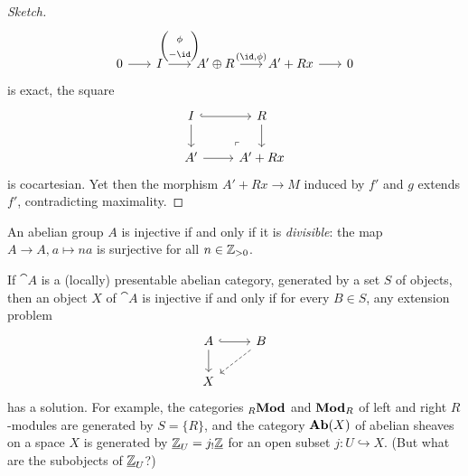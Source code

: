 \documentclass[../main.tex]{subfiles}
\begin{document}
\begin{proof}[Sketch]
\[\begin{tikzcd}[column sep=scriptsize]
        0 \ar[r] & I \ar[r, "\begin{pmatrix} \phi \\ -\id\end{pmatrix}"] & A'\oplus R \ar[r, "{(\id, \phi)}"] &A' + Rx \ar[r] & 0
    \end{tikzcd}\]
    is exact, the square
\[\begin{tikzcd}
	I & R \\
	{A'} & {A' + Rx}
	\arrow[hook, from=1-1, to=1-2]
	\arrow[from=1-1, to=2-1]
	\arrow[from=1-2, to=2-2]
	\arrow[from=2-1, to=2-2]
	\arrow["\lrcorner"{anchor=center, pos=0.125, rotate=180}, draw=none, from=2-2, to=1-1]
\end{tikzcd}\] is cocartesian. Yet then the morphism $A' + Rx \to M$ induced by $f'$ and $g$ extends $f'$, contradicting maximality.
\end{proof}

\begin{exc}[Homework 6]
An abelian group \(A\) is injective if and only if it is \emph{divisible}: the map $A\to A\text{,}\ a\mapsto na$ is surjective for all $n\in \mathbb{Z}_{>0}$.
\end{exc}

\begin{rmk}
If $\cat A$ is a (locally) presentable abelian category, generated by a set $S$ of objects, then an object \(X\) of \(\cat A\) is injective if and only if for every $B\in S$, any extension problem
\[\begin{tikzcd}
	A & B \\
	X
	\arrow[hook, from=1-1, to=1-2]
	\arrow[from=1-1, to=2-1]
	\arrow[dashed, from=1-2, to=2-1]
\end{tikzcd}\] has a solution.
For example, the categories $\catLeftModule[R]$ and $\catRightModule[R]$ of left and right \(R\)-modules are generated by $S = \{R\}$, and the category $\operatorname{\mathbf{Ab}}(X)$ of abelian sheaves on a space \(X\) is generated by $\underline{\mathbb{Z}}_U = j_{!}\underline{\mathbb{Z}}$ for an open subset $j\colon U\hookrightarrow X$.
(But what are the subobjects of $\underline{\mathbb{Z}}_U$?)
\end{rmk}
\end{document}
